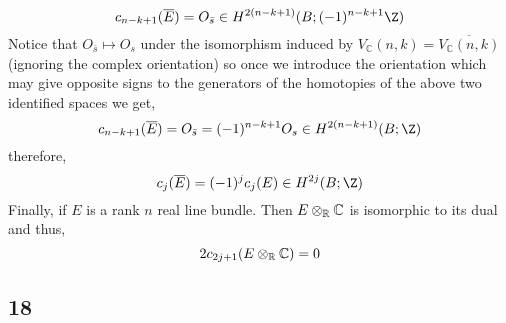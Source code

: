 \documentclass[12pt]{extarticle}
\newcommand{\C}{\mathbb{C}}
\begin{document}
\[ c_{n-k+1}(\overline{E}) = O_{\bar{s}} \in H^{2(n-k+1)}(B; (-1)^{n-k+1} \Z) \]
Notice that $O_{\bar{s}} \mapsto O_{s}$ under the isomorphism induced by $V_\C(n, k) = \overline{V_\C(n, k)}$ (ignoring the complex orientation) so once we introduce the orientation which may give opposite signs to the generators of the homotopies of the above two identified spaces we get,
\[ c_{n-k+1}(\overline{E}) = O_{\bar{s}} = (-1)^{n-k+1} O_{s} \in H^{2(n-k+1)}(B; \Z) \]
therefore,
\[ c_j(\overline{E}) = (-1)^j c_j(E) \in H^{2j}(B; \Z) \]
Finally, if $E$ is a rank $n$ real line bundle. Then $E \otimes_\R \C$ is isomorphic to its dual and thus,
\[ 2 c_{2j+1}(E \otimes_\R \C) = 0 \]

\subsection{18}
\end{document}
